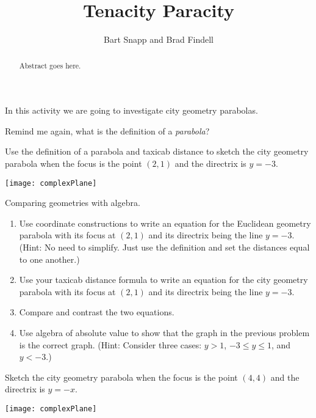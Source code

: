 \documentclass{ximera}
\title{Tenacity Paracity}
\author{Bart Snapp and Brad Findell}
\begin{document}
\begin{abstract}
Abstract goes here.  
\end{abstract}
\maketitle

In this activity we are going to investigate city geometry parabolas.

\begin{problem} 
Remind me again, what is the definition of a \textit{parabola}?
\end{problem}
\vspace{0.5in}

\begin{problem}
Use the definition of a parabola and taxicab distance to sketch the city geometry parabola when the focus is the point $(2,1)$
and the directrix is $y=-3$. 
\begin{image}
\texttt{[image: complexPlane]}
\end{image}
\end{problem}

\break
\begin{problem}
Comparing geometries with algebra. 
\begin{enumerate}
\item Use coordinate constructions to write an equation for the Euclidean geometry parabola with its focus at $(2,1)$ and its directrix being the line $y=-3$.  (Hint:  No need to simplify.  Just use the definition and set the distances equal to one another.)  
\vspace{0.5in}
\item Use your taxicab distance formula to write an equation for the city geometry parabola with its focus at $(2,1)$ and its directrix being the line $y=-3$.  
\vspace{0.5in}
\item Compare and contrast the two equations.  
\vspace{0.5in}
\item Use algebra of absolute value to show that the graph in the previous problem is the correct graph. 
 (Hint:  Consider three cases: $y>1$, $-3\leq y \leq 1$, and $y<-3$.)
\vfill
\end{enumerate}
\end{problem}

\break

\begin{problem}
Sketch the city geometry parabola when the focus is the point $(4,4)$
and the directrix is $y=-x$.
\begin{image}
\texttt{[image: complexPlane]}
\end{image}
\end{problem}
\end{document}
